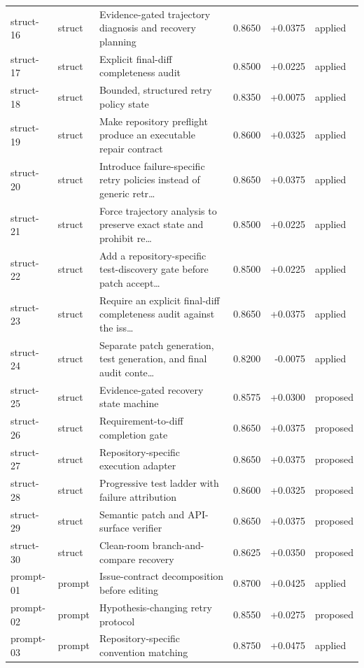 \begin{center}
\begin{longtable}{llp{5.2cm}rrl}
struct-16 & struct & Evidence-gated trajectory diagnosis and recovery planning & 0.8650 & +0.0375 & applied \\
struct-17 & struct & Explicit final-diff completeness audit & 0.8500 & +0.0225 & applied \\
struct-18 & struct & Bounded, structured retry policy state & 0.8350 & +0.0075 & applied \\
struct-19 & struct & Make repository preflight produce an executable repair contract & 0.8600 & +0.0325 & applied \\
struct-20 & struct & Introduce failure-specific retry policies instead of generic retr\ldots{} & 0.8650 & +0.0375 & applied \\
struct-21 & struct & Force trajectory analysis to preserve exact state and prohibit re\ldots{} & 0.8500 & +0.0225 & applied \\
struct-22 & struct & Add a repository-specific test-discovery gate before patch accept\ldots{} & 0.8500 & +0.0225 & applied \\
struct-23 & struct & Require an explicit final-diff completeness audit against the iss\ldots{} & 0.8650 & +0.0375 & applied \\
struct-24 & struct & Separate patch generation, test generation, and final audit conte\ldots{} & 0.8200 & -0.0075 & applied \\
struct-25 & struct & Evidence-gated recovery state machine & 0.8575 & +0.0300 & proposed \\
struct-26 & struct & Requirement-to-diff completion gate & 0.8650 & +0.0375 & proposed \\
struct-27 & struct & Repository-specific execution adapter & 0.8650 & +0.0375 & proposed \\
struct-28 & struct & Progressive test ladder with failure attribution & 0.8600 & +0.0325 & proposed \\
struct-29 & struct & Semantic patch and API-surface verifier & 0.8650 & +0.0375 & proposed \\
struct-30 & struct & Clean-room branch-and-compare recovery & 0.8625 & +0.0350 & proposed \\
prompt-01 & prompt & Issue-contract decomposition before editing & 0.8700 & +0.0425 & applied \\
prompt-02 & prompt & Hypothesis-changing retry protocol & 0.8550 & +0.0275 & proposed \\
prompt-03 & prompt & Repository-specific convention matching & 0.8750 & +0.0475 & applied \\

\end{longtable}
\end{center}
